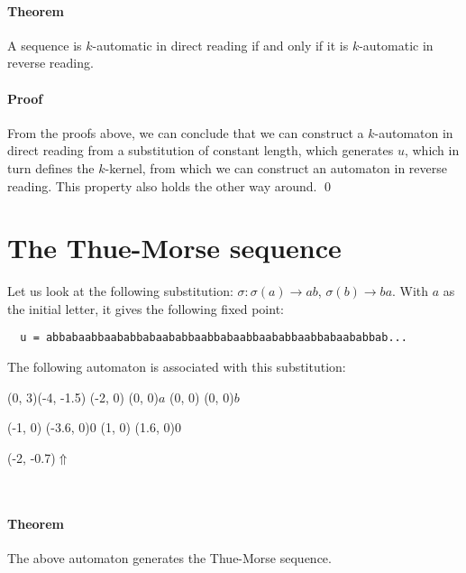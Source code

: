\documentclass{article}
\begin{document}
\paragraph{Theorem} A sequence is $k$-automatic in direct reading if and only
if it is $k$-automatic in reverse reading.

\paragraph{Proof} 
From the proofs above, we can conclude that we can construct a $k$-automaton in
direct reading from a substitution of constant length, which generates $u$,
which in turn defines the $k$-kernel, from which we can construct an automaton
in reverse reading. This property also holds the other way around. \qed

\section*{The Thue-Morse sequence}
Let us look at the following substitution: $\sigma: \sigma(a) \rightarrow ab$, 
$\sigma(b) \rightarrow ba$. With $a$ as the initial letter, it gives the 
following fixed point:
\begin{verbatim}
  u = abbabaabbaababbabaababbaabbabaabbaababbaabbabaababbab...
\end{verbatim}
The following automaton is associated with this 
substitution:\\
\begin{graph}(0, 3)(-4, -1.5)
  (-2, 0) (0, 0){$a$}
  (0, 0)  (0, 0){$b$}

  (-1, 0) \freetext(-3.6, 0){0}
   
   
  (1, 0) \freetext(1.6, 0){0}

  \freetext(-2, -0.7){$\Uparrow$}
\end{graph}\\

\paragraph{Theorem} The above automaton generates the Thue-Morse sequence.
\end{document}
